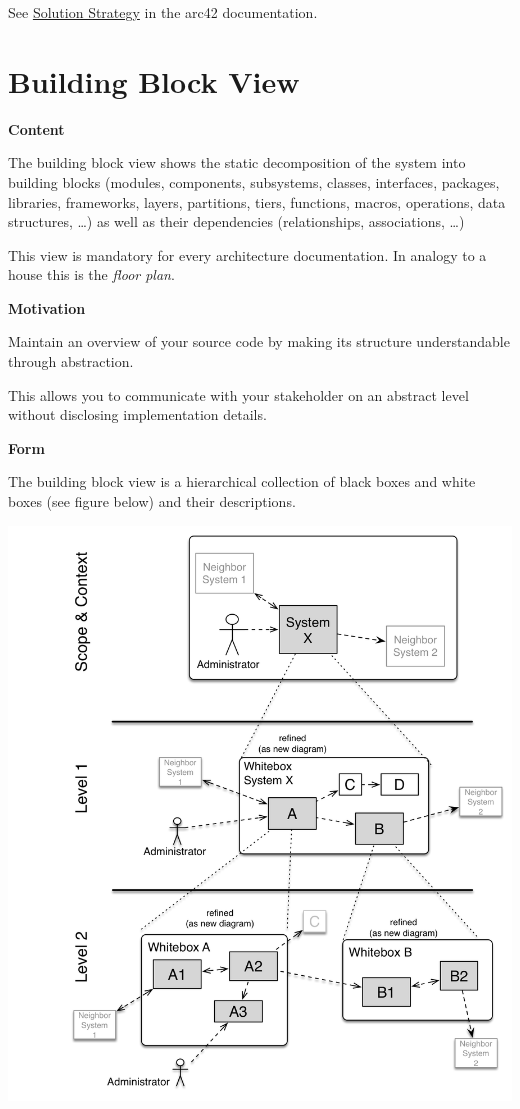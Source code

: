 \documentclass[
]{article}
\begin{document}
See \href{https://docs.arc42.org/section-4/}{Solution Strategy} in the
arc42 documentation.

\hypertarget{section-building-block-view}{%
\section{Building Block View}\label{section-building-block-view}}

\textbf{Content}

The building block view shows the static decomposition of the system
into building blocks (modules, components, subsystems, classes,
interfaces, packages, libraries, frameworks, layers, partitions, tiers,
functions, macros, operations, data structures, \ldots) as well as their
dependencies (relationships, associations, \ldots)

This view is mandatory for every architecture documentation. In analogy
to a house this is the \emph{floor plan}.

\textbf{Motivation}

Maintain an overview of your source code by making its structure
understandable through abstraction.

This allows you to communicate with your stakeholder on an abstract
level without disclosing implementation details.

\textbf{Form}

The building block view is a hierarchical collection of black boxes and
white boxes (see figure below) and their descriptions.

\includegraphics{images/05_building_blocks-EN.png}
\end{document}
